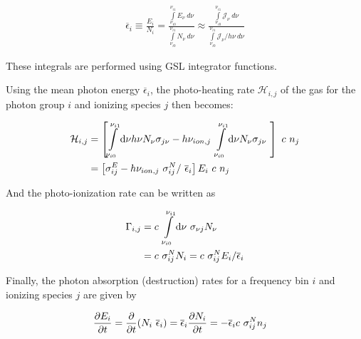\begin{align}
\overline{\epsilon}_i \equiv
    \frac{E_i}{N_i} =
    \frac{
        \int\limits_{\nu_{i0}}^{\nu_{i1}} E_\nu \ d\nu
        }{
        \int\limits_{\nu_{i0}}^{\nu_{i1}} N_\nu \ d\nu
        }
    \approx
    \frac{
        \int\limits_{\nu_{i0}}^{\nu_{i1}} \mathcal{J}_\nu \ d\nu
        }{
        \int\limits_{\nu_{i0}}^{\nu_{i1}} \mathcal{J}_\nu / h\nu \ d\nu
        }
\end{align}

These integrals are performed using GSL integrator functions.


Using the mean photon energy $\overline{\epsilon}_i$, the photo-heating rate $\mathcal{H}_{i,j}$
of the gas for the photon group $i$ and ionizing species $j$ then becomes:

\begin{align}
\mathcal{H}_{i, j} &=
\left[
		\int\limits_{\nu_{i0}}^{\nu_{i1}}\de \nu h \nu N_\nu  \sigma_{j\nu} -
	h \nu_{ion,j}\
		\int\limits_{\nu_{i0}}^{\nu_{i1}}\de \nu N_\nu \sigma_{j\nu} \
\right] \ c \ n_j \\
%
&=
\left[
	\sigma_{ij}^E  - h \nu_{ion,j}\ \sigma_{ij}^N /\ \overline{\epsilon}_i
\right]  E_i\ c \ n_j
\label{eq:photoheating-group}
\end{align}




And the photo-ionization rate can be written as

\begin{align}
\Gamma_{i, j}
	&=
		c \ \int\limits_{\nu_{i0}}^{\nu_{i1}}\mathrm{d} \nu \ \sigma_{\nu j} N_\nu \\
	&= c \ \sigma_{ij}^N N_i
	= c \ \sigma_{ij}^N E_i / \overline{\epsilon}_i \label{eq:photoionization-group}
\end{align}


Finally, the photon absorption (destruction) rates for a frequency bin $i$ and ionizing species $j$
are given by

\begin{align}
\frac{\partial E_i}{\partial t} &=
    \frac{\partial}{\partial t}{(N_i \ \overline{\epsilon}_i)} =
    \overline{\epsilon}_i \frac{\partial N_i}{\partial t} =
    -\overline{\epsilon}_i c \ \sigma_{i j} ^ N n_j
\end{align}


